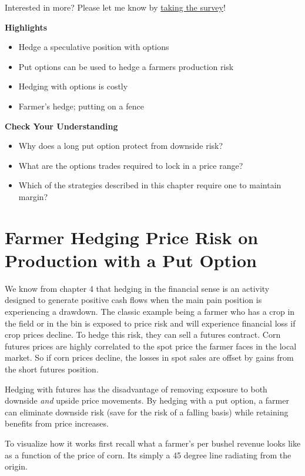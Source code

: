 \documentclass[
  letterpaper,
  DIV=11,
  numbers=noendperiod]{scrreprt}
\providecommand{\tightlist}{%
  \setlength{\itemsep}{0pt}\setlength{\parskip}{0pt}}\usepackage{longtable,booktabs,array}
\begin{document}
{Interested in more? Please let me know by}
\href{https://forms.gle/Q3VByCQZHjfQSy9D7}{taking the survey}!

\textbf{Highlights}

\begin{itemize}
\tightlist
\item
  Hedge a speculative position with options
\item
  Put options can be used to hedge a farmers production risk
\item
  Hedging with options is costly
\item
  Farmer's hedge; putting on a fence
\end{itemize}

\textbf{Check Your Understanding}

\begin{itemize}
\tightlist
\item
  Why does a long put option protect from downside risk?
\item
  What are the options trades required to lock in a price range?
\item
  Which of the strategies described in this chapter require one to
  maintain margin?
\end{itemize}

\section{Farmer Hedging Price Risk on Production with a Put
Option}\label{farmer-hedging-price-risk-on-production-with-a-put-option}

We know from chapter 4 that hedging in the financial sense is an
activity designed to generate positive cash flows when the main pain
position is experiencing a drawdown. The classic example being a farmer
who has a crop in the field or in the bin is exposed to price risk and
will experience financial loss if crop prices decline. To hedge this
risk, they can sell a futures contract. Corn futures prices are highly
correlated to the spot price the farmer faces in the local market. So if
corn prices decline, the losses in spot sales are offset by gains from
the short futures position.

Hedging with futures has the disadvantage of removing exposure to both
downside \emph{and} upside price movements. By hedging with a put
option, a farmer can eliminate downside risk (save for the risk of a
falling basis) while retaining benefits from price increases.

To visualize how it works first recall what a farmer's per bushel
revenue looks like as a function of the price of corn. Its simply a 45
degree line radiating from the origin.
\end{document}
